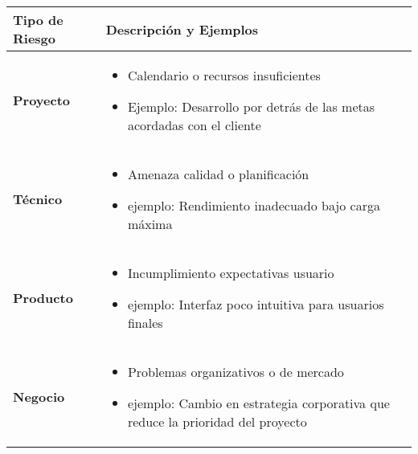 \begin{center}
    \begin{tabular}{p{3.5cm}p{9cm}}
        \toprule
        \textbf{Tipo de Riesgo} & \textbf{Descripción y Ejemplos} \\
        \midrule
        \textbf{Proyecto} &
        \begin{itemize}[leftmargin=*]
            \item Calendario o recursos insuficientes
            \item Ejemplo: Desarrollo por detrás de las metas acordadas con el cliente
        \end{itemize} \\
        \midrule
        \textbf{Técnico} &
        \begin{itemize}[leftmargin=*]
            \item Amenaza calidad o planificación
            \item ejemplo: Rendimiento inadecuado bajo carga máxima
        \end{itemize} \\
        \midrule
        \textbf{Producto} &
        \begin{itemize}[leftmargin=*]
            \item Incumplimiento expectativas usuario
            \item ejemplo: Interfaz poco intuitiva para usuarios finales
        \end{itemize} \\
        \midrule
        \textbf{Negocio} &
        \begin{itemize}[leftmargin=*]
            \item Problemas organizativos o de mercado
            \item ejemplo: Cambio en estrategia corporativa que reduce la prioridad del proyecto
        \end{itemize} \\
        \bottomrule
    \end{tabular}
\end{center}

